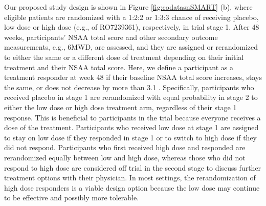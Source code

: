 Our proposed study design is shown in Figure \ref{fig:codatasnSMART} (b), where eligible patients are randomized with a 1:2:2 or 1:3:3 chance of receiving placebo, low dose or high dose (e.g., of RO7239361), respectively, in trial stage 1. After 48 weeks, participants' \ac{NSAA} total score and other secondary outcome measurements, e.g., \ac{6MWD}, are assessed, and they are assigned or rerandomized to either the same or a different dose of treatment depending on their initial treatment and their \ac{NSAA} total score. Here, we define a participant as a treatment responder at week 48 if their baseline \ac{NSAA} total score increases, stays the same, or does not decrease by more than 3.1 \citep{muntoni2018minimal}. Specifically, participants who received placebo in stage 1 are rerandomized with equal probability in stage 2 to either the low dose or high dose treatment arm, regardless of their stage 1 response. This is beneficial to participants in the trial because everyone receives a dose of the treatment. Participants who received low dose at stage 1 are assigned to stay on low dose if they responded in stage 1 or to switch to high dose if they did not respond. Participants who first received high dose and responded are rerandomized equally between low and high dose, whereas those who did not respond to high dose are considered off trial in the second stage to discuss further treatment options with their physician. In most settings, the rerandomization of high dose responders is a viable design option because the low dose may continue to be effective and possibly more tolerable. 

